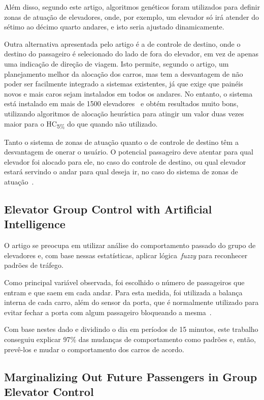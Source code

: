 Além disso, segundo este artigo, algoritmos genéticos foram utilizados para
definir zonas de atuação de elevadores, onde, por exemplo, um elevador só irá
atender do sétimo ao décimo quarto andares, e isto seria ajustado dinamicamente.

Outra alternativa apresentada pelo artigo é a de controle de destino, onde o
destino do passageiro é selecionado do lado de fora do elevador, em vez de
apenas uma indicação de direção de viagem. Isto permite, segundo o artigo, um
planejamento melhor da alocação dos carros, mas tem a desvantagem de não poder
ser facilmente integrado a sistemas existentes, já que exige que painéis novos e
mais caros sejam instalados em todos os andares. No entanto, o sistema  está
instalado em mais de 1500 elevadores~\cite{KOEHLEROTTIGER02} e obtém resultados
muito bons, utilizando algoritmos de alocação heurística para atingir um valor
duas vezes maior para o HC\textsubscript{5\%} do que quando não utilizado.

Tanto o sistema de zonas de atuação quanto o de controle de destino têm a
desvantagem de onerar o usuário. O potencial passageiro deve atentar para qual
elevador foi alocado para ele, no caso do controle de destino, ou qual elevador
estará servindo o andar para qual deseja ir, no caso do sistema de zonas de
atuação~\cite{KOEHLEROTTIGER02}.

\subsection{\label{section:marja}Elevator Group Control with Artificial
Intelligence~\cite{marja97}}

O artigo  se preocupa em utilizar análise do comportamento passado do grupo de
elevadores e, com base nessas estatísticas, aplicar lógica~\textit{fuzzy} para
reconhecer padrões de tráfego.

Como principal variável observada, foi escolhido o número de passageiros que
entram e que saem em cada andar. Para esta medida, foi utilizada a balança
interna de cada carro, além do sensor da porta, que é normalmente utilizado para
evitar fechar a porta com algum passageiro bloqueando a mesma~\cite{marja97}.

Com base nestes dado e dividindo o dia em períodos de 15 minutos, este trabalho
conseguiu explicar 97\% das mudanças de comportamento como padrões e, então,
prevê-los e mudar o comportamento dos carros de acordo.

\subsection{\label{section:dblp}Marginalizing Out Future Passengers in Group
Elevator Control~\cite{DBLP:journals/corr/abs-1212-2499}}

